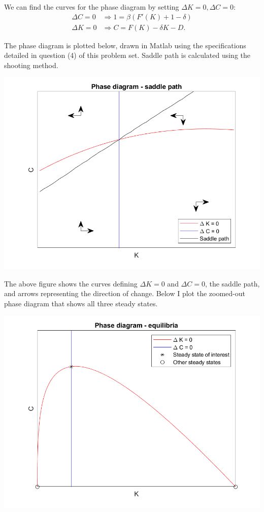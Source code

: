 \documentclass[11pt]{article} %
\begin{document}
We can find the curves for the phase diagram by setting $\Delta K = 0, \Delta C = 0:$
\begin{align*}
\Delta C = 0 &\Rightarrow 1 = \beta  (F'(K) + 1-\delta)\\
\Delta K = 0 &\Rightarrow C = F(K) -\delta K - D.
\end{align*}

The phase diagram is plotted below, drawn in Matlab using the specifications detailed in question (4) of this problem set. Saddle path is calculated using the shooting method.

\includegraphics{phasesad}

The above figure shows the curves defining $\Delta K = 0$ and $\Delta C = 0$, the saddle path, and arrows representing the direction of change. Below I plot the zoomed-out phase diagram that shows all three steady states.

\includegraphics{phaseeq}
\end{document}
